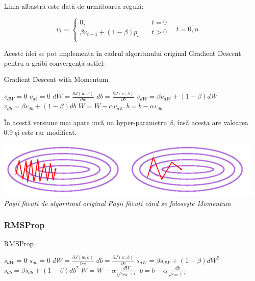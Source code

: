 Linia albastră este dată de următoarea regulă:

\[
v_t=
	\begin{cases}
		\text{0,} &\quad t=0 \\
		\beta v_{t-1} + (1-\beta)p_t &\quad t > 0 \\
	\end{cases}
\quad t=\overline{0,n}
\]

Aceste idei se pot implementa în cadrul algoritmului original Gradient Descent pentru a grăbi convergență astfel:

\begin{algorithm}
\caption{Gradient Descent with Momentum}
\begin{algorithmic}[2]
\State $v_{dW} = 0$
$v_{db} = 0$
\State $dW = \frac{\partial J(w,b)}{\partial w}$
\State $db = \frac{\partial J(w,b)}{\partial b}$
\State $v_{dW} = \beta v_{dW} + (1-\beta)dW$
\State $v_{db} = \beta v_{db} + (1-\beta)db$
\State $W = W - \alpha v_{dW}$
\State $b = b - \alpha v_{db}$
\EndWhile
\end{algorithmic}
\end{algorithm}

În acestă versiune mai apare incă un hyper-parametru $\beta$, însă acesta are valoarea 0.9 și este rar modificat.

\begin{center}
\includegraphics[scale=0.5]{momentum} \\
\textit{Pașii făcuți de algoritmul original} \quad \textit{Pașii făcuți când se folosește Momentum}
\end{center}

\subsubsection{RMSProp}

\begin{algorithm}
\caption{RMSProp}
\begin{algorithmic}[3]
\State $s_{dW} = 0$
$s_{db} = 0$
\State $dW = \frac{\partial J(w,b)}{\partial w}$
\State $db = \frac{\partial J(w,b)}{\partial b}$
\State $s_{dW} = \beta s_{dW} + (1-\beta)dW^2$
\State $s_{db} = \beta s_{db} + (1-\beta)db^2$
\State $\displaystyle{W = W - \alpha \frac{dW}{\sqrt{s_{dW} + \epsilon}}}$
\State $\displaystyle{b = b - \alpha \frac{db}{\sqrt{s_{db} + \epsilon}}}$
\EndWhile
\end{algorithmic}
\end{algorithm}


